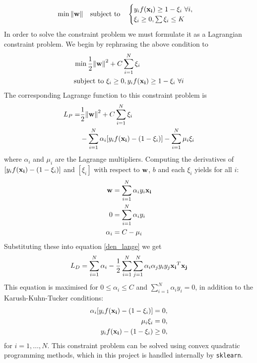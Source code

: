 \documentclass[notitlepage, reprint, nofootinbib]{revtex4-1}
\begin{document}
\begin{equation} \min\norm{\vb{w}}\qq{subject to}\begin{cases}y_i f(\vb{x_i})\geq 1-\xi_i \ \forall i, \\ \xi_i\geq 0, \sum\xi_i\leq K\end{cases}\end{equation}
In order to solve the constraint problem we must formulate it as a Lagrangian constraint problem. We begin by rephrasing the above condition to 
\begin{align} 
	&\min \frac{1}{2}\norm{\vb{w}}^2 + C\sum_{i=1}^N \xi_i \nonumber \\
	&\text{subject to} \ \xi_i\geq0, y_i f(\vb{x_i}) \geq 1-\xi_i\ \forall i
\end{align}
The corresponding Lagrange function to this constraint problem is 
\begin{align}
	L_P = &\frac{1}{2}\norm{\vb{w}}^2 + C\sum_{i=1}^N \xi_i\nonumber \\
	&-\sum_{i=1}^N\alpha_i[y_if(\vb{x_i})-(1-\xi_i)]-\sum_{i=1}^N\mu_i\xi_i \label{den_lange}
\end{align}
where $\alpha_i$ and $\mu_i$ are the Lagrange multipliers. Computing the derivatives of $[y_if(\vb{x_i})-(1-\xi_i)]$ and $[\xi_i]$ with respect to $\vb{w}$, $b$ and each $\xi_i$ yields for all $i$: 
\begin{align}
	\vb{w}&=\sum_{i=1}^N\alpha_i y_i \vb{x_i}\\
	0&=\sum_{i=1}^N\alpha_i y_i\\
	\alpha_i &= C-\mu_i
\end{align}
Substituting these into equation \ref{den_lange} we get
\begin{equation} L_D=\sum_{i=1}^N \alpha_i-\frac{1}{2}\sum_{i=1}^N\sum_{j=1}^N \alpha_i\alpha_jy_iy_j \vb{x_i}^T\vb{x_j}\end{equation}
This equation is maximised for $0\leq\alpha_i\leq C$ and $\sum_{i=1}^N\alpha_iy_i=0$, in addition to the Karush-Kuhn-Tucker conditions: 
\begin{align}
	\alpha_i [y_if(\vb{x_i})-(1-\xi_i)]&=0, \\
	\mu_i\xi_i &= 0, \\
	y_if(\vb{x_i})-(1-\xi_i)&\geq 0,
\end{align}
for $i=1,\dots, N$. This constraint problem can be solved using convex quadratic programming methods, which in this project is handled internally by \texttt{sklearn}.
\end{document}
